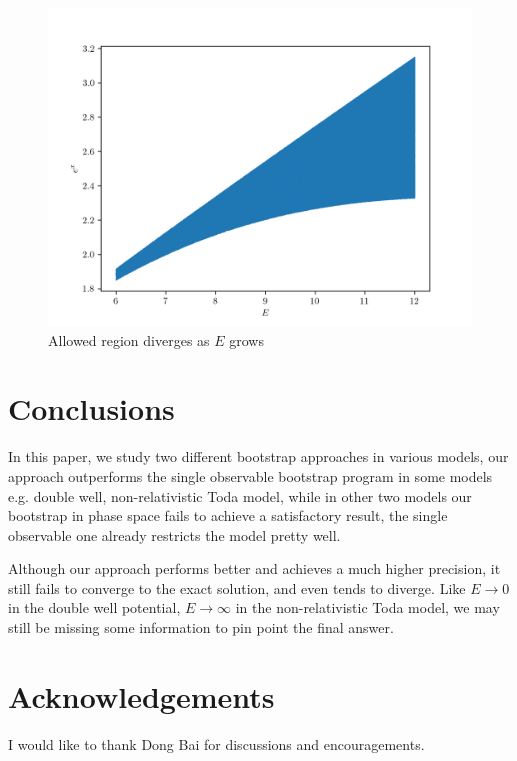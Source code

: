 \documentclass[aps, preprint,amsmath, amssymb]{revtex4-2}
\begin{document}
\begin{figure}
    \includegraphics[width=0.8\linewidth]{todal.png}
    \caption{Allowed region diverges as $E$ grows}
    \label{fig:todal}
\end{figure}

\section{Conclusions}
In this paper, we study two different bootstrap approaches in various models, our approach outperforms the single observable bootstrap program in some models e.g. double well, non-relativistic Toda model, while in other two models our bootstrap in phase space fails to achieve a satisfactory result, the single observable one already restricts the model pretty well.

Although our approach performs better and achieves a much higher precision, it still fails to converge to the exact solution, and even tends to diverge. Like $E \to 0$ in the double well potential, $E \to \infty$ in the non-relativistic Toda model, we may still be missing some information to pin point the final answer.

\section*{Acknowledgements}
I would like to thank Dong Bai for discussions and encouragements.


\end{document}

